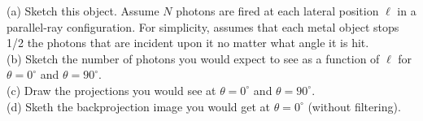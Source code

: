 \documentclass{article}
\begin{document}
(a) Sketch this object. Assume $N$ photons are fired at each lateral position $\ell$ in a parallel-ray configuration. For simplicity, assumes that each metal object stops 1/2 the photons that are incident upon it no matter what angle it is hit.\\

(b) Sketch the number of photons you would expect to see as a function of $\ell$ for $\theta = 0^\circ$ and $\theta = 90^\circ$. \\

(c) Draw the projections you would see at $\theta = 0^\circ$ and $\theta = 90^\circ$.\\

(d) Sketh the backprojection image you would get at $\theta = 0^\circ$ (without filtering). 

\vspace{12pt}

\end{document}
